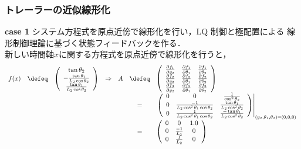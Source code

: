 \begin{frame}[t] 
\frametitle{トレーラーの近似線形化}

\noindent
{\bf case 1}
      システム方程式を原点近傍で線形化を行い，LQ 制御と極配置による
      線形制御理論に基づく状態フィードバックを作る．\\
      新しい時間軸$x$に関する方程式を原点近傍で線形化を行うと，
\begin{equation*}
 \begin{array}{lclclcl}
  f(x) &\defeq&
   \left(
    \begin{array}{c}
     \tan \theta_2 \\
     -\frac{\tan \theta_1}{L_2 \cos \theta_2} \\
     \frac{\tan \theta_1}{L_2 \cos \theta_2} 
    \end{array}
   \right) &\Rightarrow&
   A &\defeq&
   \left(
    \begin{array}{ccc}
     \frac{\partial f_1}{\partial y_2} &
      \frac{\partial f_1}{\partial \theta_1} &
      \frac{\partial f_1}{\partial \theta_2} \\
     \frac{\partial f_2}{\partial y_2} &
      \frac{\partial f_2}{\partial \theta_1} &
      \frac{\partial f_2}{\partial \theta_2} \\
     \frac{\partial f_3}{\partial y_2} &
      \frac{\partial f_3}{\partial \theta_1} &
      \frac{\partial f_3}{\partial \theta_2} 
    \end{array}
  \right) \\
  & & & & &=&
  \left. \left(
  \begin{array}{ccc}
   0 & 0 & \frac{1}{\cos ^2 \theta_2} \\
   0 & \frac{-1}{L_2\cos ^2 \theta_1 \cos \theta_2} &
    \frac{\tan \theta_1}{L_2 \cos ^2 \theta_2} \\
   0 & \frac{1}{L_2\cos ^2 \theta_1 \cos \theta_2} &
    \frac{-\tan \theta_1}{L_2 \cos ^2 \theta_2} \\
  \end{array}
  \right) \right|_{(y_2,\theta_1, \theta_2) = (0, 0, 0)} \\
  & & & & &=&
  \left(
   \begin{array}{ccc}
    0 & 0  & 1.0 \\
    0 & \frac{-1}{L_2} & 0 \\
    0 & \frac{1}{L_2}  & 0
   \end{array}
  \right) \\

\end{array}
\end{equation*}
\end{frame}
